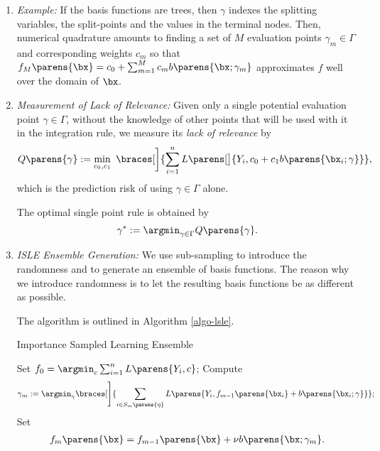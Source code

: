 \documentclass[12pt]{article}
\begin{document}
\begin{enumerate}[label=\textbf{\arabic*.}]
\begin{enumerate}
		\item \textit{Example:} If the basis functions are trees, then $\gamma$ indexes the splitting variables, the split-points and the values in the terminal nodes. Then, numerical quadrature amounts to finding a set of $M$ evaluation points $\gamma_m \in \Gamma$ and corresponding weights $c_m$ so that $f_M \parens{\bx} = c_0 + \sum_{m=1}^M c_m b \parens{\bx; \gamma_m}$ approximates $f$ well over the domain of $\bx$. 
		
		\item \textit{Measurement of Lack of Relevance:} Given only a single potential evaluation point $\gamma \in \Gamma$, without the knowledge of other points that will be used with it in the integration rule, we measure its \emph{lack of relevance} by 
		\begin{align*}
			Q \parens{\gamma} := \min_{c_0, c_1} \ \braces[\bigg]{\sum_{i=1}^n L \parens[\big]{Y_i, c_0 + c_1 b \parens{\bx_i; \gamma}}}, 
		\end{align*}
		which is the prediction risk of using $\gamma \in \Gamma$ alone. 
		
		The optimal single point rule is obtained by 
		\begin{align*}
			\gamma^* := \argmin_{\gamma \in \Gamma} Q \parens{\gamma}. 
		\end{align*}
		
		\item \textit{ISLE Ensemble Generation:} We use sub-sampling to introduce the randomness and to generate an ensemble of basis functions. The reason why we introduce randomness is to let the resulting basis functions be as different as possible. 
		
		The algorithm is outlined in Algorithm \ref{algo-lsle}. 
		
		\begin{minipage}{\linewidth}
			\begin{algorithm}[H]
			\caption{Importance Sampled Learning Ensemble}\label{algo-lsle}
			\begin{algorithmic}[1]
				\STATE Set $f_0 = \argmin_c \sum_{i=1}^n L \parens{Y_i, c}$; 
				\STATE Compute 
				\begin{align*}
					\gamma_m := \argmin_{\gamma} \braces[\Bigg]{\sum_{i \in S_m \parens{\eta}} L \parens{Y_i, f_{m-1} \parens{\bx_i} + b \parens{\bx_i; \gamma}}}; 
				\end{align*}
				\STATE Set 
				\begin{align*}
					f_m \parens{\bx} = f_{m-1} \parens{\bx} + \nu b \parens{\bx; \gamma_m}. 
				\end{align*}
				\ENDFOR
				

\end{algorithmic}
\end{algorithm}
\end{minipage}
\end{enumerate}
\end{enumerate}
\end{document}
